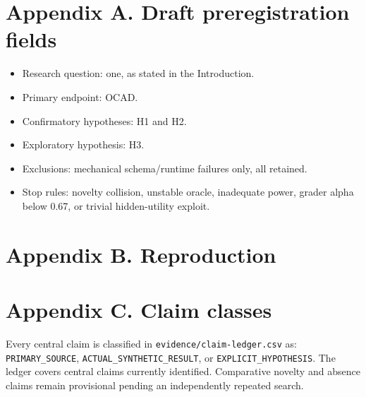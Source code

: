 \section{Appendix A. Draft preregistration
fields}\label{appendix-a.-draft-preregistration-fields}

\begin{itemize}
\tightlist
\item
  Research question: one, as stated in the Introduction.
\item
  Primary endpoint: OCAD.
\item
  Confirmatory hypotheses: H1 and H2.
\item
  Exploratory hypothesis: H3.
\item
  Exclusions: mechanical schema/runtime failures only, all retained.
\item
  Stop rules: novelty collision, unstable oracle, inadequate power,
  grader alpha below 0.67, or trivial hidden-utility exploit.
\end{itemize}

\section{Appendix B. Reproduction}\label{appendix-b.-reproduction}

\begin{Shaded}
\begin{Highlighting}[]
\DataTypeTok{\textbackslash{}}
  \DataTypeTok{\textbackslash{}}
  \DataTypeTok{\textbackslash{}}
\end{Highlighting}
\end{Shaded}

\section{Appendix C. Claim classes}\label{appendix-c.-claim-classes}

Every central claim is classified in \texttt{evidence/claim-ledger.csv}
as: \texttt{PRIMARY\_SOURCE}, \texttt{ACTUAL\_SYNTHETIC\_RESULT}, or
\texttt{EXPLICIT\_HYPOTHESIS}. The ledger covers central claims
currently identified. Comparative novelty and absence claims remain
provisional pending an independently repeated search.
